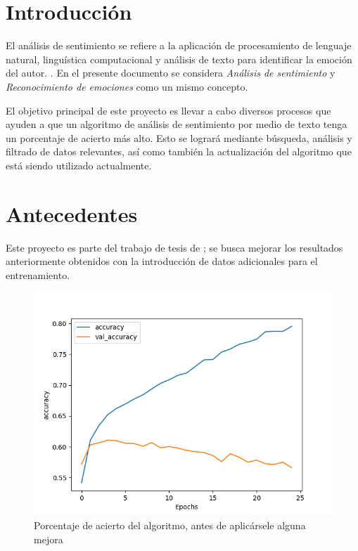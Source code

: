 \documentclass[a4]{sciposter}
\begin{document}
\begin{multicols}{3} 

\section{Introducción}
El análisis de sentimiento se refiere a la aplicación de procesamiento de lenguaje natural, linguística computacional y análisis de texto para identificar la emoción del autor. \citep{definition}. En el presente documento se considera \textit{Análisis de sentimiento} y \textit{Reconocimiento de emociones} como un mismo concepto.

El objetivo principal de este proyecto es llevar a cabo diversos procesos que ayuden a que un algoritmo de análisis de sentimiento por medio de texto tenga un porcentaje de acierto más alto. Esto se logrará mediante búsqueda, análisis y filtrado de datos relevantes, así como también la actualización del algoritmo que está siendo utilizado actualmente.

\section{Antecedentes}
Este proyecto es parte del trabajo de tesis de \citet{chatbot}; se busca mejorar los resultados anteriormente obtenidos con la introducción de datos adicionales para el entrenamiento.

\begin{figure}
	\centering
	\captionsetup{type=figure}
	\setcounter{figure}{0}
	\includegraphics[scale=1.3]{img/Accuracy 2020-05_nofilter}
	\caption{Porcentaje de acierto del algoritmo, antes de aplicársele alguna mejora}
	

\end{figure}
\end{multicols}
\end{document}
